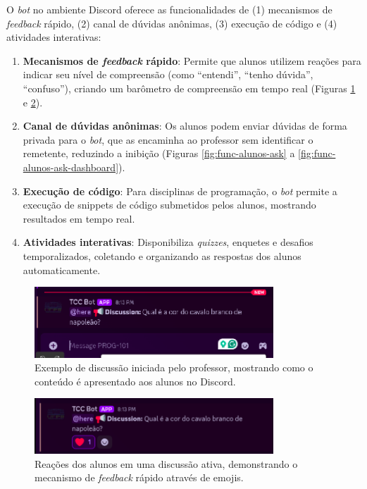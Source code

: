 O \textit{bot} no ambiente Discord oferece as funcionalidades de (1) mecanismos
de \textit{feedback} rápido, (2) canal de dúvidas anônimas, (3) execução de
código e (4) atividades interativas:

\begin{enumerate}
\item \textbf{Mecanismos de \textit{feedback} rápido}: Permite que alunos
utilizem reações para indicar seu nível de compreensão (como ``entendi'', ``tenho
dúvida'', ``confuso''), criando um barômetro de compreensão em tempo real 
(Figuras \ref{fig:func-alunos-discussao} e \ref{fig:func-alunos-reacoes}).
\item \textbf{Canal de dúvidas anônimas}: Os alunos podem enviar dúvidas de
forma privada para o \textit{bot}, que as encaminha ao professor sem identificar
o remetente, reduzindo a inibição (Figuras \ref{fig:func-alunos-ask} a 
\ref{fig:func-alunos-ask-dashboard}).
\item \textbf{Execução de código}: Para disciplinas de programação, o
\textit{bot} permite a execução de snippets de código submetidos pelos alunos,
mostrando resultados em tempo real.
\item \textbf{Atividades interativas}: Disponibiliza \textit{quizzes}, enquetes
e desafios temporalizados, coletando e organizando as respostas dos alunos
automaticamente.
\end{enumerate}

\begin{figure}[H]
\centering
\includegraphics[width=0.8\textwidth]{func-alunos/iniciada-discussao.png}
\caption{Exemplo de discussão iniciada pelo professor, mostrando como o conteúdo é apresentado aos alunos no Discord.}
\label{fig:func-alunos-discussao}
\end{figure}

\begin{figure}[H]
\centering
\includegraphics[width=0.8\textwidth]{func-alunos/reacao-iniciada-discussao.png}
\caption{Reações dos alunos em uma discussão ativa, demonstrando o mecanismo de \textit{feedback} rápido através de emojis.}
\label{fig:func-alunos-reacoes}
\end{figure}

